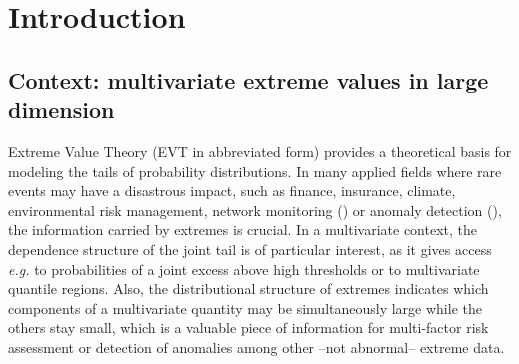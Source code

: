 \section{Introduction}
\label{jmva:sec:intro}

\subsection{Context: multivariate extreme values in large dimension}

Extreme Value Theory (EVT in abbreviated form) provides a theoretical basis for
modeling the tails of probability  distributions. In many applied fields where 
rare events  may have a disastrous impact, such as 
finance, insurance, climate,  environmental risk management, network
monitoring (\cite{finkenstadt2003extreme,smith2003statistics}) or  
anomaly detection (\cite{Clifton2011,Lee2008}), the information carried by extremes is crucial. In a multivariate context, the dependence structure
of the joint tail is of particular interest, as it gives access
\emph{e.g.} to probabilities of a joint excess above high thresholds or
to multivariate quantile regions. Also, the distributional structure of
extremes indicates which components of a multivariate quantity may be
simultaneously large while the others stay small, which is a valuable
piece of information for multi-factor risk assessment or
detection of anomalies among other --not abnormal--  extreme data. 



